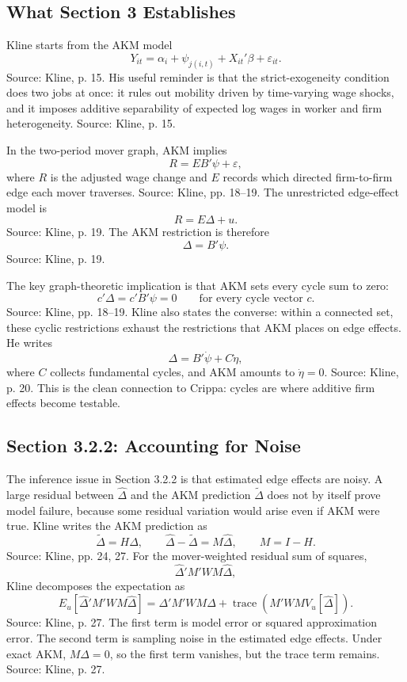 \documentclass[11pt]{article}
\begin{document}
\subsection{What Section 3 Establishes}

Kline starts from the AKM model
\[
Y_{it}=\alpha_i+\psi_{j(i,t)}+X_{it}'\beta+\varepsilon_{it}.
\]
Source: Kline, p. 15. His useful reminder is that the strict-exogeneity condition does
two jobs at once: it rules out mobility driven by time-varying wage shocks, and it
imposes additive separability of expected log wages in worker and firm heterogeneity.
Source: Kline, p. 15.

In the two-period mover graph, AKM implies
\[
R=EB'\psi+\varepsilon,
\]
where $R$ is the adjusted wage change and $E$ records which directed firm-to-firm
edge each mover traverses. Source: Kline, pp. 18--19. The unrestricted edge-effect
model is
\[
R=E\Delta+u.
\]
Source: Kline, p. 19. The AKM restriction is therefore
\[
\Delta=B'\psi.
\]
Source: Kline, p. 19.

The key graph-theoretic implication is that AKM sets every cycle sum to zero:
\[
c'\Delta=c'B'\psi=0
\qquad \text{for every cycle vector } c.
\]
Source: Kline, pp. 18--19. Kline also states the converse: within a connected set,
these cyclic restrictions exhaust the restrictions that AKM places on edge effects.
He writes
\[
\Delta=B'\dot\psi+C\dot\eta,
\]
where $C$ collects fundamental cycles, and AKM amounts to $\dot\eta=0$. Source:
Kline, p. 20. This is the clean connection to Crippa: cycles are where additive
firm effects become testable.

\subsection{Section 3.2.2: Accounting for Noise}

The inference issue in Section 3.2.2 is that estimated edge effects are noisy. A large
residual between $\hat\Delta$ and the AKM prediction $\tilde\Delta$ does not by itself
prove model failure, because some residual variation would arise even if AKM were
true. Kline writes the AKM prediction as
\[
\tilde\Delta=H\hat\Delta,
\qquad
\hat\Delta-\tilde\Delta=M\hat\Delta,
\qquad
M=I-H.
\]
Source: Kline, pp. 24, 27. For the mover-weighted residual sum of squares,
\[
\hat\Delta'M'WM\hat\Delta,
\]
Kline decomposes the expectation as
\[
E_u[\hat\Delta'M'WM\hat\Delta]
=\Delta'M'WM\Delta+
\operatorname{trace}\!\left(M'WMV_u[\hat\Delta]\right).
\]
Source: Kline, p. 27. The first term is model error or squared approximation error.
The second term is sampling noise in the estimated edge effects. Under exact AKM,
$M\Delta=0$, so the first term vanishes, but the trace term remains. Source: Kline,
p. 27.
\end{document}
